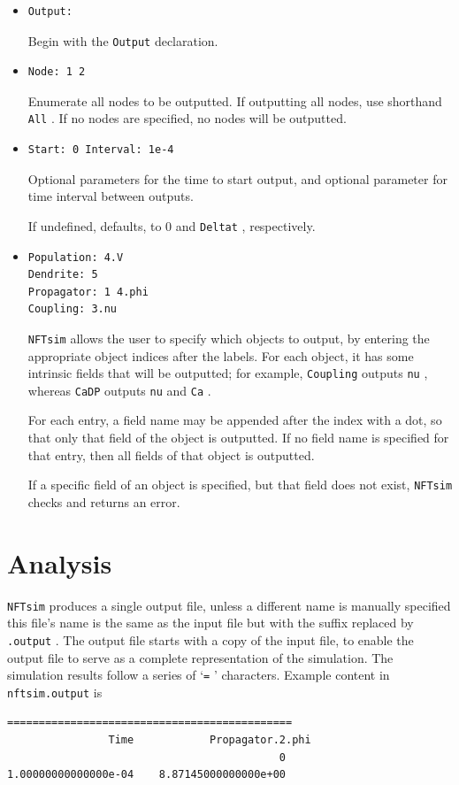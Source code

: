 \documentclass[12pt,a4paper]{article}
\newcommand{\type}[1]{{\small\small\tt #1} }
\newcommand{\NF}[0]{\type{NFTsim}}
\begin{document}
\begin{itemize}
    \item \begin{lstlisting}
Output:
        \end{lstlisting}
Begin with the \type{Output} declaration.
\item \begin{lstlisting}
Node: 1 2
\end{lstlisting}
Enumerate all nodes to be outputted. If outputting all nodes, use shorthand \type{All}. If no nodes are specified, no nodes will be outputted.
\item \begin{lstlisting}
Start: 0 Interval: 1e-4
\end{lstlisting}
Optional parameters for the time to start output, and optional parameter for time interval between outputs.

If undefined, defaults, to 0 and \type{Deltat}, respectively.
\item \begin{lstlisting}
Population: 4.V
Dendrite: 5
Propagator: 1 4.phi
Coupling: 3.nu
\end{lstlisting}

\NF allows the user to specify which objects to output, by entering the appropriate object indices after the labels. For each object, it has some intrinsic fields that will be outputted; for example, \type{Coupling} outputs \type{nu}, whereas \type{CaDP} outputs \type{nu} and \type{Ca}.

For each entry, a field name may be appended after the index with a dot, so that only that field of the object is outputted. If no field name is specified for that entry, then all fields of that object is outputted.

If a specific field of an object is specified, but that field does not exist, \NF checks and returns an error.

\end{itemize}

\section{Analysis}
\label{sec:analysis}

\NF produces a single output file, unless a different name is manually specified this file's name is the same as the input file but with the suffix replaced by \type{.output}. The output file starts with a copy of the input file, to enable the output file to serve as a complete representation of the simulation. The simulation results follow a series of `\type{=}' characters. Example content in \type{nftsim.output} is
\begin{lstlisting}
=============================================
                Time            Propagator.2.phi
                                           0
1.00000000000000e-04    8.87145000000000e+00
\end{lstlisting}
\end{document}
